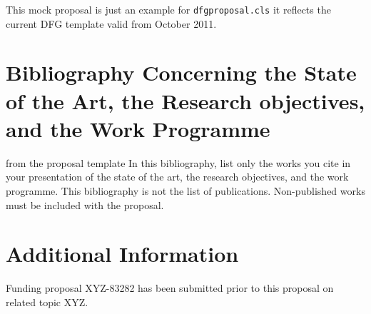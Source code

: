 \documentclass[    %
    gitinfo,       %
    RAM,           %
    general,       %
    \classoptions] %
    {dfgproposal}
\begin{document}
\begin{center}\color{red}\huge
  This mock proposal is just an example for \texttt{dfgproposal.cls} it reflects the 
  current DFG template valid from October 2011.
\end{center}

\begin{proposal}[
  PI=miko,
  mikoname=Michael Kohlhase,
  mikoaffiliation=FAU Erlangen N\"urnberg,
  mikodept=Computer Science,
  mikotitle=Prof. Dr.,
  PI=gc,
  gcname=Michael Kohlhase,
  gcaffiliation=Power Consulting GmbH,
  gcdept=Science Affairs,
  gctitle=Dr.,
  site=fau,
  fauacronym=FAU,
  faushortname=FAU Erlangen N\"urnberg,
  site=pcg,
  pcgacronym=PCG,
  pcgshortname=Power Consulting GmbH,
  thema=Intelligentes Schreiben von Antr\"agen,
  acronym={iPoWr},
  acrolong={\underline{I}ntelligent} {\underline{P}r\underline{o}posal} {\underline{Wr}iting},
  title=\pn: \protect\pnlong,
  totalduration=3 years,
  start=1. Feb. 2010,
  months=24,
  discipline=Computer Science, 
  areas=Knowledge Management,
  keywords={LaTeX Active Documents}
  ]






\section{Bibliography Concerning the State of the Art, the Research objectives, and the
  Work Programme}\label{sec:bib}

\begin{todo}{from the proposal template}
In this bibliography, list only the works you cite in your presentation of the state of the
art, the research objectives, and the work programme. This bibliography is not the list
of publications. Non-published works must be included with the proposal.
\end{todo}
\printbibliography[heading=empty,notcategory=featured]
\ifpublic\else



\section{Additional Information}\label{sec:additional}

Funding proposal XYZ-83282 has been submitted prior to this proposal on related topic XYZ.
\fi %
\end{proposal}
\end{document}
